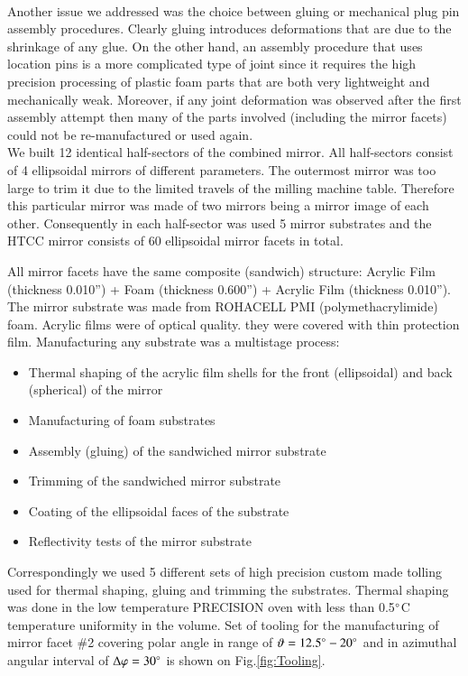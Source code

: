 \\
\indent Another issue we addressed was the choice between gluing or mechanical plug pin assembly procedures. Clearly gluing introduces deformations that are due to the shrinkage of any glue. On the other hand, an assembly procedure that uses location pins is a more complicated type of joint since it requires the high precision processing of plastic foam parts that are both very lightweight and mechanically weak. Moreover, if any joint deformation was observed after the first assembly attempt then many of the parts involved (including the mirror facets) could not be re-manufactured or used again.
\\
\indent We built 12 identical half-sectors of the combined mirror. All half-sectors consist of 4 ellipsoidal mirrors of different parameters. The outermost mirror was too large to trim it due to the limited travels of the milling machine table. Therefore this particular mirror was made of two mirrors being a mirror image of each other. Consequently in each half-sector was used 5 mirror substrates and the HTCC mirror consists of 60 ellipsoidal mirror facets in total. 

\indent All mirror facets have the same composite (sandwich) structure: Acrylic Film (thickness 0.010”) + Foam (thickness 0.600”) + Acrylic Film (thickness 0.010”). The mirror substrate was made from ROHACELL PMI (polymethacrylimide) foam. Acrylic films were of optical quality. they were covered with thin protection film. Manufacturing any substrate was a multistage process:
\begin{itemize}
    \item Thermal shaping of the acrylic film shells for the front (ellipsoidal) and back (spherical) of the mirror
    \item Manufacturing of foam substrates
    \item Assembly (gluing) of the sandwiched mirror substrate
    \item Trimming of the sandwiched mirror substrate
    \item Coating of the ellipsoidal faces of the substrate
    \item Reflectivity tests of the mirror substrate
    \end{itemize}

Correspondingly we used 5 different sets of high precision custom made tolling used for thermal shaping, gluing and trimming the substrates. Thermal shaping was done in the low temperature PRECISION oven with less than  0.5$\degree$C   temperature uniformity in the volume. Set of tooling for the manufacturing of mirror facet \#2 covering polar angle in range of $\vartheta = 12.5\degree - 20\degree$ and in azimuthal angular interval of $\Delta\varphi = 30\degree$ is shown on Fig.\ref{fig:Tooling}.

